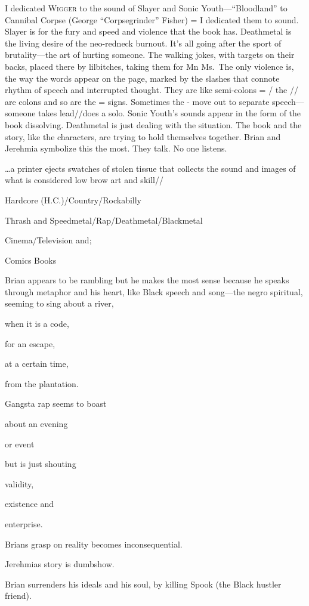 \documentclass[
]{memoir}
\begin{document}
I dedicated \textsc{Wigger} to the sound of Slayer and Sonic
Youth---``Bloodland'' to Cannibal Corpse (George ``Corpsegrinder''
Fisher) = I dedicated them to sound. Slayer is for the fury and speed
and violence that the book has. Deathmetal is the living desire of the
neo-redneck burnout. It's all going after the sport of brutality---the
art of hurting someone. The walking jokes, with targets on their backs,
placed there by lilbitches, taking them for Mn Ms.~The only violence is,
the way the words appear on the page, marked by the slashes that connote
rhythm of speech and interrupted thought. They are like semi-colons = /
the // are colons and so are the = signs. Sometimes the - move out to
separate speech---someone takes lead//does a solo. Sonic Youth's sounds
appear in the form of the book dissolving. Deathmetal is just dealing
with the situation. The book and the story, like the characters, are
trying to hold themselves together. Brian and Jerehmia symbolize this
the most. They talk. No one listens.

\ldots{}a printer ejects swatches of stolen tissue that collects the
sound and images of what is considered low brow art and skill//

Hardcore (H.C.)/Country/Rockabilly

Thrash and Speedmetal/Rap/Deathmetal/Blackmetal

Cinema/Television and;

Comics Books

Brian appears to be rambling but he makes the most sense because he
speaks through metaphor and his heart, like Black speech and song---the
negro spiritual, seeming to sing about a river,

when it is a code,

for an escape,

at a certain time,

from the plantation.

Gangsta rap seems to boast

about an evening

or event

but is just shouting

validity,

existence and

enterprise.

Brians grasp on reality becomes inconsequential.

Jerehmias story is dumbshow.

Brian surrenders his ideals and his soul, by killing Spook (the Black
hustler friend).
\end{document}
